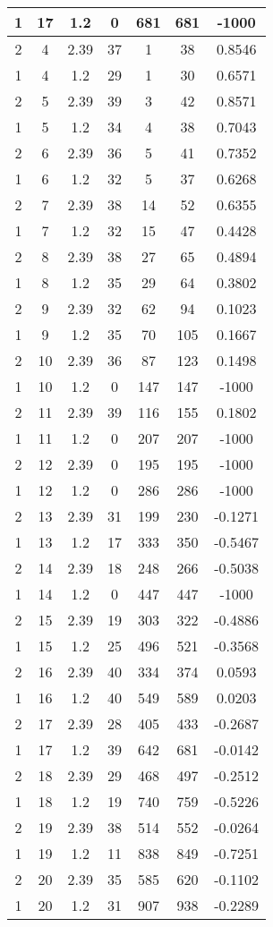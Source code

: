 \documentclass[letterpaper, 12pt]{article}
\begin{document}
\begin{longtable}{|c|c|c|c|c|c|c|}
\hline
1 & 17 & 1.2 & 0 & 681 & 681 & -1000 \\
\hline
2 & 4 & 2.39 & 37 & 1 & 38 & 0.8546 \\
\hline
1 & 4 & 1.2 & 29 & 1 & 30 & 0.6571 \\
\hline
2 & 5 & 2.39 & 39 & 3 & 42 & 0.8571 \\
\hline
1 & 5 & 1.2 & 34 & 4 & 38 & 0.7043 \\
\hline
2 & 6 & 2.39 & 36 & 5 & 41 & 0.7352 \\
\hline
1 & 6 & 1.2 & 32 & 5 & 37 & 0.6268 \\
\hline
2 & 7 & 2.39 & 38 & 14 & 52 & 0.6355 \\
\hline
1 & 7 & 1.2 & 32 & 15 & 47 & 0.4428 \\
\hline
2 & 8 & 2.39 & 38 & 27 & 65 & 0.4894 \\
\hline
1 & 8 & 1.2 & 35 & 29 & 64 & 0.3802 \\
\hline
2 & 9 & 2.39 & 32 & 62 & 94 & 0.1023 \\
\hline
1 & 9 & 1.2 & 35 & 70 & 105 & 0.1667 \\
\hline
2 & 10 & 2.39 & 36 & 87 & 123 & 0.1498 \\
\hline
1 & 10 & 1.2 & 0 & 147 & 147 & -1000 \\
\hline
2 & 11 & 2.39 & 39 & 116 & 155 & 0.1802 \\
\hline
1 & 11 & 1.2 & 0 & 207 & 207 & -1000 \\
\hline
2 & 12 & 2.39 & 0 & 195 & 195 & -1000 \\
\hline
1 & 12 & 1.2 & 0 & 286 & 286 & -1000 \\
\hline
2 & 13 & 2.39 & 31 & 199 & 230 & -0.1271 \\
\hline
1 & 13 & 1.2 & 17 & 333 & 350 & -0.5467 \\
\hline
2 & 14 & 2.39 & 18 & 248 & 266 & -0.5038 \\
\hline
1 & 14 & 1.2 & 0 & 447 & 447 & -1000 \\
\hline
2 & 15 & 2.39 & 19 & 303 & 322 & -0.4886 \\
\hline
1 & 15 & 1.2 & 25 & 496 & 521 & -0.3568 \\
\hline
2 & 16 & 2.39 & 40 & 334 & 374 & 0.0593 \\
\hline
1 & 16 & 1.2 & 40 & 549 & 589 & 0.0203 \\
\hline
2 & 17 & 2.39 & 28 & 405 & 433 & -0.2687 \\
\hline
1 & 17 & 1.2 & 39 & 642 & 681 & -0.0142 \\
\hline
2 & 18 & 2.39 & 29 & 468 & 497 & -0.2512 \\
\hline
1 & 18 & 1.2 & 19 & 740 & 759 & -0.5226 \\
\hline
2 & 19 & 2.39 & 38 & 514 & 552 & -0.0264 \\
\hline
1 & 19 & 1.2 & 11 & 838 & 849 & -0.7251 \\
\hline
2 & 20 & 2.39 & 35 & 585 & 620 & -0.1102 \\
\hline
1 & 20 & 1.2 & 31 & 907 & 938 & -0.2289 \\
\hline
\end{longtable}
\end{document}
